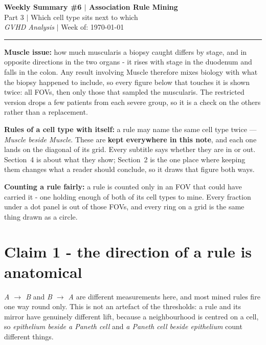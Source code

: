 \documentclass[10pt, a4paper]{article}
\begin{document}
\begin{center}
    {\Large \textbf{Weekly Summary \#6 $\vert$ Association Rule Mining}} \\[0.5em]
    {\large Part 3 $\vert$ Which cell type sits next to which} \\[0.5em]
    \textit{GVHD Analysis} $\vert$ Week of: \today
\end{center}
\vspace{0.2cm}
\hrule
\vspace{0.5cm}

\textbf{Muscle issue:} how much muscularis a biopsy caught differs by stage, and in
opposite directions in the two organs - it rises with stage in the duodenum and falls in
the colon. Any result involving Muscle therefore mixes biology with what the biopsy
happened to include, so every figure below that touches it is shown twice: all FOVs, then
only those that sampled the muscularis. The restricted version drops a few patients from
each severe group, so it is a check on the others rather than a replacement.

\textbf{Rules of a cell type with itself:} a rule may name the same cell type twice ---
\emph{Muscle beside Muscle}. These are \textbf{kept everywhere in this note}, and each one
lands on the diagonal of its grid. Every subtitle says whether they are in or out.
Section~4 is about what they show; Section~2 is the one place where keeping them changes
what a reader should conclude, so it draws that figure both ways.

\textbf{Counting a rule fairly:} a rule is counted only in an FOV that could have carried
it - one holding enough of both of its cell types to mine. Every fraction under a dot panel
is out of those FOVs, and every ring on a grid is the same thing drawn as a circle.

\section{Claim 1 - the direction of a rule is anatomical}

\textit{A $\rightarrow$ B} and \textit{B $\rightarrow$ A} are different measurements here,
and most mined rules fire one way round only. This is not an artefact of the thresholds: a
rule and its mirror have genuinely different lift, because a neighbourhood is centred on a
cell, so \emph{epithelium beside a Paneth cell} and \emph{a Paneth cell beside epithelium}
count different things.
\end{document}
